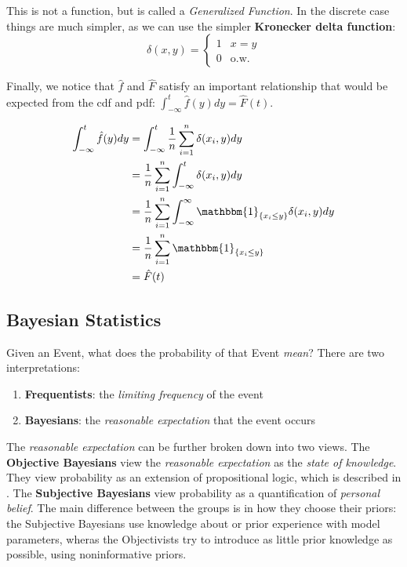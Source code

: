 \documentclass[]{article}
\theoremstyle{mattstyle}
\theoremstyle{definition}
\begin{document}
This is not a function, but is called a \emph{Generalized Function}. In the discrete case things are much simpler, as we can use the simpler \textbf{Kronecker delta function}:
\begin{equation}
	\delta(x,y) = 
	\begin{cases}
		1 & x=y \\
		0 & \text{o.w.}
	\end{cases}
\end{equation}

Finally, we notice that $\hat{f}$ and $\hat{F}$ satisfy an important relationship that would be expected from the cdf and pdf: $\int_{-\infty}^{t}\hat{f}(y)dy = \hat{F}(t)$.

\begin{align*}
\int_{-\infty}^{t}\hat{f}(y)dy &= \int_{-\infty}^{t} \frac{1}{n}\sum_{i=1}^n \delta(x_i, y)dy\\
&= \frac{1}{n}\sum_{i=1}^n \int_{-\infty}^{t}  \delta(x_i, y)dy\\
&= \frac{1}{n}\sum_{i=1}^n \int_{-\infty}^{\infty} \mathbbm{1}_{\{x_i \le y\}} \delta(x_i, y)dy\\
&= \frac{1}{n}\sum_{i=1}^n \mathbbm{1}_{\{x_i \le y\}}\\
&= \hat{F}(t)
\end{align*}

\newpage
\subsection{Bayesian Statistics}

Given an Event, what does the probability of that Event \emph{mean}? There are two interpretations:

\begin{enumerate}
	\item \textbf{Frequentists}: the \emph{limiting frequency} of the event
	\item \textbf{Bayesians}: the \emph{reasonable expectation} that the event occurs
\end{enumerate}

The \emph{reasonable expectation} can be further broken down into two views. The \textbf{Objective Bayesians} view the \emph{reasonable expectation} as the \emph{state of knowledge}. They view probability as an extension of propositional logic, which is described in \cite{jaynes}. The \textbf{Subjective Bayesians} view probability as a quantification of \emph{personal belief}. The main difference between the groups is in how they choose their priors: the Subjective Bayesians use knowledge about or prior experience with model parameters, wheras the Objectivists try to introduce as little prior knowledge as possible, using noninformative priors.
\end{document}
